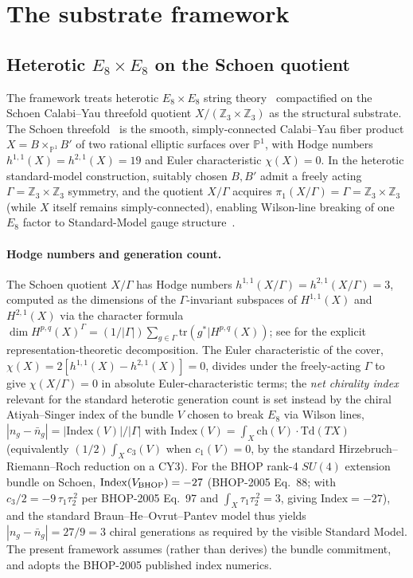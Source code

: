 ﻿\documentclass[reprint,amsmath,amssymb,aps,prd,longbibliography,floatfix]{revtex4-2}
\begin{document}
\section{The substrate framework}
\label{sec:framework}

\subsection{Heterotic $E_8 \times E_8$ on the Schoen quotient}

The framework treats heterotic $E_8 \times E_8$ string
theory~\cite{GHMR1985} compactified on the Schoen Calabi--Yau threefold
quotient $X/(\mathbb{Z}_3 \times \mathbb{Z}_3)$ as the structural
substrate. The Schoen threefold~\cite{Schoen1988} is the smooth,
simply-connected Calabi--Yau fiber product
$X = B \times_{\mathbb{P}^1} B'$ of two rational elliptic surfaces
over $\mathbb{P}^1$, with Hodge numbers $h^{1,1}(X) = h^{2,1}(X) = 19$
and Euler characteristic $\chi(X) = 0$. In the heterotic
standard-model construction, suitably chosen $B, B'$ admit a
freely acting $\Gamma = \mathbb{Z}_3 \times \mathbb{Z}_3$ symmetry,
and the quotient $X/\Gamma$ acquires
$\pi_1(X/\Gamma) = \Gamma = \mathbb{Z}_3 \times \mathbb{Z}_3$
(while $X$ itself remains simply-connected), enabling Wilson-line
breaking of one $E_8$ factor to Standard-Model gauge
structure~\cite{BraunHeOvrutPantev2005,
DonagiOvrut2005}.

\paragraph{Hodge numbers and generation count.}
The Schoen quotient $X/\Gamma$ has Hodge numbers
$h^{1,1}(X/\Gamma) = h^{2,1}(X/\Gamma) = 3$, computed as the
dimensions of the $\Gamma$-invariant subspaces of $H^{1,1}(X)$ and
$H^{2,1}(X)$ via the character formula
$\dim H^{p,q}(X)^\Gamma = (1/|\Gamma|)\sum_{g \in \Gamma}
\mathrm{tr}(g^* | H^{p,q}(X))$; see
\cite{BraunHeOvrutPantev2005} for the explicit
representation-theoretic decomposition. The Euler characteristic
of the cover, $\chi(X) = 2[h^{1,1}(X) - h^{2,1}(X)] = 0$, divides
under the freely-acting $\Gamma$ to give $\chi(X/\Gamma) = 0$ in
absolute Euler-characteristic terms; the
\emph{net chirality index} relevant for the standard heterotic
generation count is set instead by the chiral Atiyah--Singer
index of the bundle $V$ chosen to break $E_8$ via Wilson lines,
$|n_g - \bar n_g| = |\mathrm{Index}(V)|/|\Gamma|$ with
$\mathrm{Index}(V) = \int_X \mathrm{ch}(V) \cdot \mathrm{Td}(TX)$
(equivalently $(1/2)\int_X c_3(V)$ when $c_1(V) = 0$, by the
standard Hirzebruch--Riemann--Roch reduction on a CY3). For the
BHOP rank-4 $SU(4)$ extension bundle on Schoen,
$\mathrm{Index}(V_{\rm BHOP}) = -27$ (BHOP-2005 Eq.~88; with
$c_3/2 = -9\,\tau_1\tau_2^{\,2}$ per BHOP-2005 Eq.~97 and
$\int_X \tau_1\tau_2^{\,2} = 3$, giving $\mathrm{Index} = -27$),
and the standard Braun--He--Ovrut--Pantev model thus yields
$|n_g - \bar n_g| = 27/9 = 3$ chiral generations as required by
the visible Standard Model. The present framework assumes (rather
than derives) the bundle commitment, and adopts the BHOP-2005
published index numerics.
\end{document}

